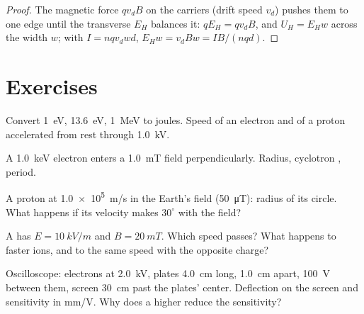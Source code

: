 \begin{proof}
The magnetic force $qv_dB$ on the carriers (drift speed $v_d$) pushes
them to one edge until the transverse  $E_H$ balances it:
$qE_H = qv_dB$, and $U_H = E_Hw$ across the width $w$; with $I = nqv_dwd$,
$E_Hw = v_dBw = IB/(nqd)$.
\end{proof}

\section{Exercises}

\begin{exercise}[$\star$]\label{exo:b1:charged-particles:1}
Convert \qty{1}{eV}, \qty{13.6}{eV}, \qty{1}{MeV} to joules. Speed of an
electron and of a proton accelerated from rest through \qty{1.0}{kV}.
\end{exercise}

\begin{exercise}[$\star$]\label{exo:b1:charged-particles:2}
A \qty{1.0}{keV} electron enters a \qty{1.0}{mT} field perpendicularly.
Radius, cyclotron , period.
\end{exercise}

\begin{exercise}[$\star$]\label{exo:b1:charged-particles:3}
A proton at \qty{1.0e5}{m/s} in the Earth's field (\qty{50}{\micro T}):
radius of its circle. What happens if its velocity makes $30^\circ$ with
the field?
\end{exercise}

\begin{exercise}[$\star$]\label{exo:b1:charged-particles:4}
A  has $E = \qty{10}{kV/m}$ and $B = \qty{20}{mT}$. Which
speed passes? What happens to faster ions, and to the same speed with
the opposite charge?
\end{exercise}

\begin{exercise}[$\star\star$]\label{exo:b1:charged-particles:5}
Oscilloscope: electrons at \qty{2.0}{kV}, plates \qty{4.0}{cm} long,
\qty{1.0}{cm} apart, \qty{100}{V} between them, screen \qty{30}{cm} past
the plates' center. Deflection on the screen and sensitivity in mm/V.
Why does a higher  reduce the sensitivity?
\end{exercise}

